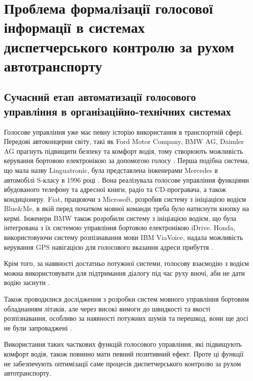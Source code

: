 \chapter{Проблема формалізації голосової інформації в системах диспетчерського контролю за рухом автотранспорту} \label{chapt1}


\section{Сучасний етап автоматизації голосового управління в організаційно-технічних системах} \label{sect1_2}

Голосове управління уже має певну історію використання в транспортній сфері. Передові автоконцерни світу, такі як Ford Motor Company, BMW AG, Daimler AG прагнуть підвищити безпеку та комфорт водія, тому створюють можливість керування бортовою електронікою за допомогою голосу \cite{Kravchenko_2009}. Перша подібна система, що мала назву Linguatronic, була представлена інженерами Mercedes в автомобілі S-класу в 1996 році \cite{Heisterkamp_2001}. Вона реалізувала голосове управління функціями вбудованого телефону та адресної книги, радіо та CD-програвача, а також кондиціонеру. Fiat, працюючи з Microsoft, розробив систему з ініціацією водієм Blue\&Me, в якій перед початком мовної команди треба було натиснути кнопку на кермі. Інженери BMW також розробили систему з ініціацією водієм, що була інтегрована з їх системою управління бортовою електронікою iDrive. Honda, використовуючи систему розпізнавання мови IBM ViaVoice, надала можливість керування GPS навігацією для голосового вказання адреси прибуття \cite{Jonsson_2009}.

Крім того, за наявності достатньо потужної системи, голосову взаємодію з водієм можна використовувати для підтримання діалогу під час руху вночі, аби не дати водію заснути \cite{Kravchenko_2012}.

Також проводилися дослідження з розробки систем мовного управління бортовим обладнанням літаків, але через високі вимоги до швидкості та якості розпізнавання, особливо за наявності потужних шумів та перешкод, вони ще досі не були запроваджені \cite{Korsun_2013}.

Використання таких часткових функцій голосового управління, які підвищують комфорт водія, також повинно мати певний позитивний ефект. Проте ці функції не забезпечують оптимізації саме процесів диспетчерського контролю за рухом автотранспорту.

